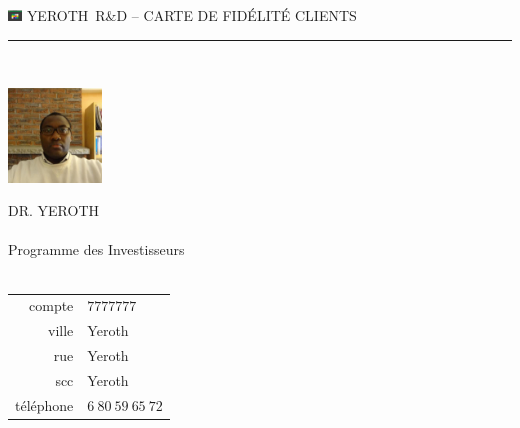 \documentclass[11pt,a4paper]{memoir}
\begin{document}
    \begin{Spacing}{0.75}%
    \noindent
	\includegraphics[height=3mm]{../yeroth-erp-3-0-images/yeroth-erp-3-0-icon.png}
	{\tiny \emptyset \hfill \textcolor{yerothColorGold}{YEROTH~R\&D -- CARTE DE FID\'ELIT\'E CLIENTS}}\\
    \vspace{-0.25em}
    \rule{74mm}{.3mm}\\
    \begin{minipage}[t]{33mm}
        \vspace{-0mm}%
        \includegraphics[height=25mm]{../doc/francais/images/XavierNOUNDOU-2}
    \end{minipage}
    \hspace{1mm}
    \begin{minipage}[t]{42mm}
        \vspace{-0mm}%
        \begin{flushleft}
        {\scriptsize
            \begin{Spacing}{1}%
            \textcolor{yerothColorGold}{DR. YEROTH}\\
            \hspace{5mm} \\
            \hspace{5mm} Programme des Investisseurs \\
            \hspace{5mm} \vspace{2mm}\\
            \end{Spacing}
        }
        {\tiny
        	\begin{tabular}{rl}
            	{\color{gray}compte} & $7777777$\\
            	{\color{gray}ville} & Yeroth\\
            	{\color{gray}rue} & Yeroth\\
            	{\color{gray}scc} & Yeroth\\
            	{\color{gray}t\'el\'ephone} & $6\ 80\ 59\ 65\ 72$\\
            \end{tabular}
}
\end{flushleft}
\end{minipage}
\end{Spacing}
\end{document}
